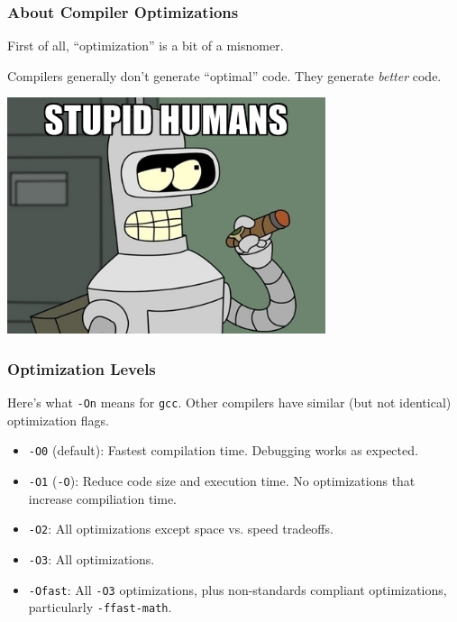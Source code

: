 \begin{frame}
\frametitle{About Compiler Optimizations}

First of all, ``optimization'' is
a bit of a misnomer. 

Compilers generally don't generate ``optimal'' code. They generate \emph{better} code.

\begin{center}
\includegraphics[width=0.7\textwidth]{images/bender.jpg}
\end{center}


\end{frame}


\begin{frame}
\frametitle{Optimization Levels}

Here's what {\tt -On} means for
{\tt gcc}. Other compilers have similar (but not identical) optimization flags.

\begin{itemize}
\item {\tt -O0} (default): Fastest compilation time. Debugging works as expected.
\item {\tt -O1} ({\tt -O}): Reduce code size and execution time.
 No optimizations that increase compiliation time.
\item {\tt -O2}: All optimizations except space vs. speed tradeoffs.
\item {\tt -O3}: All optimizations.
\item {\tt -Ofast}: All {\tt -O3} optimizations, plus non-standards compliant optimizations,
      particularly {\tt -ffast-math}.
\end{itemize}

\end{frame}


